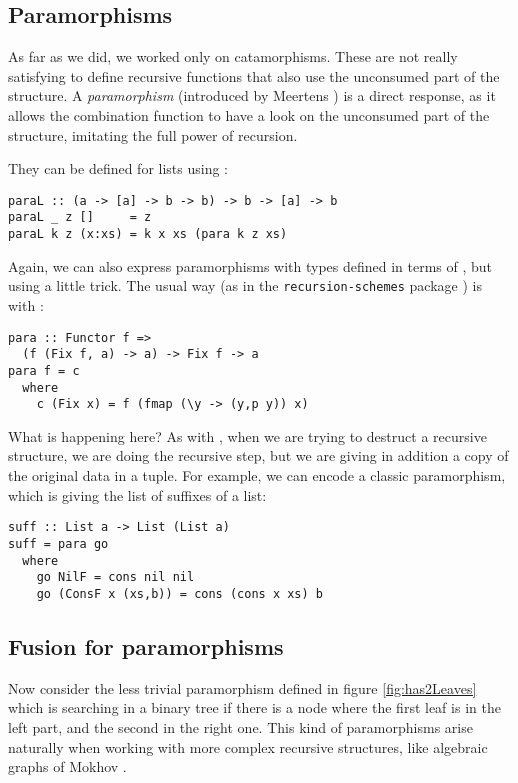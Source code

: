 \subsection{Paramorphisms}
\label{sec:para-list}

As far as we did, we worked only on catamorphisms. These are not really satisfying to define recursive functions that also use the unconsumed part of the structure. A \emph{paramorphism} (introduced by Meertens \cite{Meertens1992}) is a direct response, as it allows the combination function to have a look on the unconsumed part of the structure, imitating the full power of recursion.

They can be defined for lists using :
\begin{verbatim}
paraL :: (a -> [a] -> b -> b) -> b -> [a] -> b
paraL _ z []     = z
paraL k z (x:xs) = k x xs (para k z xs)
\end{verbatim}

Again, we can also express paramorphisms with types defined in terms of , but using a little trick. The usual way (as in the \verb|recursion-schemes| package \cite{ekmett:eschems}) is with :
\begin{verbatim}
para :: Functor f =>
  (f (Fix f, a) -> a) -> Fix f -> a
para f = c
  where
    c (Fix x) = f (fmap (\y -> (y,p y)) x)
\end{verbatim}

\noindent What is happening here? As with , when we are trying to destruct a recursive structure, we are doing the recursive step, but we are giving in addition a copy of the original data in a tuple.
For example, we can encode a classic paramorphism, which is giving the list of suffixes of a list:
\begin{verbatim}
suff :: List a -> List (List a)
suff = para go
  where
    go NilF = cons nil nil
    go (ConsF x (xs,b)) = cons (cons x xs) b
\end{verbatim}

\subsection{Fusion for paramorphisms}

Now consider the less trivial paramorphism  defined in figure \ref{fig:has2Leaves} which is searching in a binary tree if there is a node where the first leaf is in the left part, and the second in the right one. This kind of paramorphisms arise naturally when working with more complex recursive structures, like algebraic graphs of Mokhov \cite{Mokhov:2017:AGC:3156695.3122956}.

